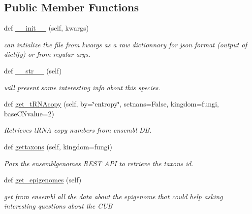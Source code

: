 \subsection*{Public Member Functions}
\begin{DoxyCompactItemize}
\item 
\mbox{\label{class_py_c_u_b_1_1espece_1_1_espece_a13a7403216d2c03d6e9ec81d6034196e}} 
def \mbox{\hyperlink{class_py_c_u_b_1_1espece_1_1_espece_a13a7403216d2c03d6e9ec81d6034196e}{\+\_\+\+\_\+init\+\_\+\+\_\+}} (self, kwargs)
\begin{DoxyCompactList}\small\item\em can intialize the file from kwargs as a raw dictionnary for json format (output of dictify) or from regular args. \end{DoxyCompactList}\item 
\mbox{\label{class_py_c_u_b_1_1espece_1_1_espece_a4222c359e63e76ea34631a427b62fd60}} 
def \mbox{\hyperlink{class_py_c_u_b_1_1espece_1_1_espece_a4222c359e63e76ea34631a427b62fd60}{\+\_\+\+\_\+str\+\_\+\+\_\+}} (self)
\begin{DoxyCompactList}\small\item\em will present some interesting info about this species. \end{DoxyCompactList}\item 
def \mbox{\hyperlink{class_py_c_u_b_1_1espece_1_1_espece_afa35655bb969cbc02456aa74228a1b8d}{get\+\_\+t\+R\+N\+Acopy}} (self, by=\char`\"{}entropy\char`\"{}, setnans=False, kingdom=\textquotesingle{}fungi\textquotesingle{}, base\+C\+Nvalue=2)
\begin{DoxyCompactList}\small\item\em Retrieves t\+R\+NA copy numbers from ensembl DB. \end{DoxyCompactList}\item 
def \mbox{\hyperlink{class_py_c_u_b_1_1espece_1_1_espece_af716fcd7e7e34e12cd7786469d695422}{gettaxons}} (self, kingdom=\textquotesingle{}fungi\textquotesingle{})
\begin{DoxyCompactList}\small\item\em Pars the ensemblgenomes R\+E\+ST A\+PI to retrieve the taxons id. \end{DoxyCompactList}\item 
\mbox{\label{class_py_c_u_b_1_1espece_1_1_espece_aed93f9be40c4521c6aed536125268432}} 
def \mbox{\hyperlink{class_py_c_u_b_1_1espece_1_1_espece_aed93f9be40c4521c6aed536125268432}{get\+\_\+epigenomes}} (self)
\begin{DoxyCompactList}\small\item\em get from ensembl all the data about the epigenome that could help asking interesting questions about the C\+UB \end{DoxyCompactList}\end{DoxyCompactItemize}
